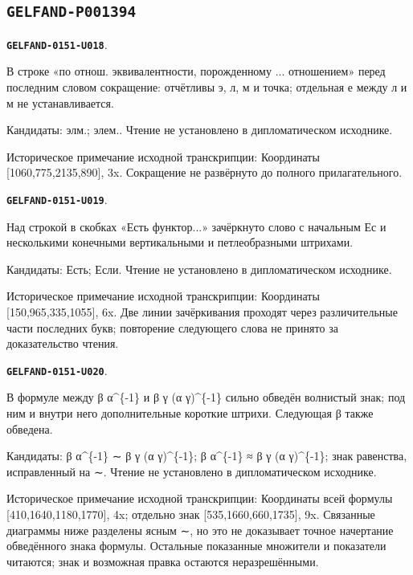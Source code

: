 \documentclass[11pt]{article}
\theoremstyle{definition}
\theoremstyle{remark}
\begin{document}
\subsection*{\texttt{GELFAND-P001394}}
\par\noindent\leavevmode{}\label{GELFAND-0151-U018}\label{GELFAND-P001394:elementary-abbrev:note}\textbf{\texttt{GELFAND-0151-U018}}.\nopagebreak[4]\par
В строке «по отнош. эквивалентности, порожденному ... отношением» перед последним словом сокращение: отчётливы э, л, м и точка; отдельная е между л и м не устанавливается.\par
Кандидаты: элм.; элем.. Чтение не установлено в дипломатическом исходнике.\par
Историческое примечание исходной транскрипции: Координаты [1060,775,2135,890], 3x. Сокращение не развёрнуто до полного прилагательного.\par\medskip
\par\noindent\leavevmode{}\label{GELFAND-0151-U019}\label{GELFAND-P001394:cancelled-there:note}\textbf{\texttt{GELFAND-0151-U019}}.\nopagebreak[4]\par
Над строкой в скобках «Есть функтор...» зачёркнуто слово с начальным Ес и несколькими конечными вертикальными и петлеобразными штрихами.\par
Кандидаты: Есть; Если. Чтение не установлено в дипломатическом исходнике.\par
Историческое примечание исходной транскрипции: Координаты [150,965,335,1055], 6x. Две линии зачёркивания проходят через различительные части последних букв; повторение следующего слова не принято за доказательство чтения.\par\medskip
\par\noindent\leavevmode{}\label{GELFAND-0151-U020}\label{GELFAND-P001394:fraction-relation:note}\textbf{\texttt{GELFAND-0151-U020}}.\nopagebreak[4]\par
В формуле между β α\textasciicircum{}\{-1\} и β γ (α γ)\textasciicircum{}\{-1\} сильно обведён волнистый знак; под ним и внутри него дополнительные короткие штрихи. Следующая β также обведена.\par
Кандидаты: β α\textasciicircum{}\{-1\} ∼ β γ (α γ)\textasciicircum{}\{-1\}; β α\textasciicircum{}\{-1\} ≈ β γ (α γ)\textasciicircum{}\{-1\}; знак равенства, исправленный на ∼. Чтение не установлено в дипломатическом исходнике.\par
Историческое примечание исходной транскрипции: Координаты всей формулы [410,1640,1180,1770], 4x; отдельно знак [535,1660,660,1735], 9x. Связанные диаграммы ниже разделены ясным ∼, но это не доказывает точное начертание обведённого знака формулы. Остальные показанные множители и показатели читаются; знак и возможная правка остаются неразрешёнными.\par\medskip
\end{document}
